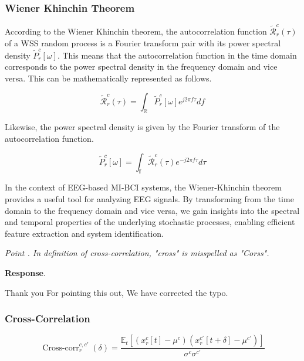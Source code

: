 \documentclass[runningheads]{llncs}
\newcommand{\Real}{\mathbb{R}}
\newenvironment{reviewer}{\setcounter{pointcounter}{1}}{}
\newcommand{\changes}[1]{\textcolor[rgb]{1.00,0.00,0.00}{#1}}
\newcommand{\point}[1]{\medskip \noindent
  \textsl{{\fontseries{b}\selectfont Point \thepointcounter}.
\stepcounter{pointcounter} #1}}
\newcommand{\reply}{\medskip \noindent \textbf{Response}.\ }
\begin{document}
\begin{reviewer}
{    \subsubsection{Wiener Khinchin Theorem}

    According to the Wiener Khinchin theorem, the autocorrelation
    function \changes{$\mathcal{\tilde{R}}^{c}_{r}(\tau)$} of a WSS
    random process is a Fourier transform pair with its power
    spectral density \changes{$\tilde{P}^{c}_{r}[\omega]$}. This
    means that the autocorrelation function in the time domain
    corresponds to the power spectral density in the frequency domain
    and vice versa. This can be mathematically represented as follows.

    \changes{
      \begin{equation}
        \mathcal{\tilde{R}}^{c}_{r}(\tau) = \int_{\Real}
        \tilde{P}^{c}_{r}[\omega] e^{j 2\pi f \tau} df
      \end{equation}
    }

    Likewise, the power spectral density is given by the Fourier
    transform of the autocorrelation function.

    \changes{
      \begin{equation}
        \tilde{P}^{c}_{r}[\omega] = \int_{\mathbb{f}}
        \mathcal{\tilde{R}}^{c}_{r}(\tau) e^{-j 2\pi f \tau} d\tau
      \end{equation}
    }

    In the context of EEG-based MI-BCI systems, the Wiener-Khinchin
    theorem provides a useful tool for analyzing EEG signals. By
    transforming from the time domain to the frequency domain and
    vice versa, we gain insights into the spectral and temporal
    properties of the underlying stochastic processes, enabling
    efficient feature extraction and system identification.
  }

  \point{
    In definition of cross-correlation,  "cross" is misspelled as "Corss".
  }

  \reply{
    Thank you For pointing this out, We have corrected the typo.
    \changes{
      \subsubsection{Cross-Correlation}
    }

    \changes{
      \begin{equation}
        \operatorname{Cross-corr}^{c,c'}_{r}(\delta)=\frac{\mathbb{E}_{t}\left[
            \left( x^{c}_{r} [t] - \mu^{c} \right)
        \left(x^{c'}_{r}[t+\delta]-\mu^{c'}\right)\right]}{\sigma^{c}
        \sigma^{c'}}
      \end{equation}
    }
  }


\end{reviewer}
\end{document}
